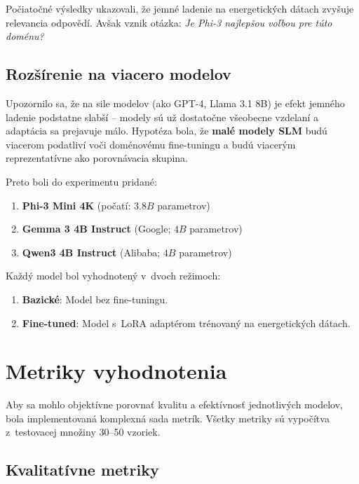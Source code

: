 Počiatočné výsledky ukazovali, že jemné ladenie na energetických dátach zvyšuje relevancia odpovědí. Avšak vznik otázka: \emph{Je Phi-3 najlepšou voľbou pre túto doménu?}


\subsection{Rozšírenie na viacero modelov}

Upozornilo sa, že na sile modelov (ako GPT-4, Llama 3.1 8B) je efekt jemného ladenie podstatne slabší -- modely sú už dostatočne všeobecne vzdelaní a adaptácia sa prejavuje málo. Hypotéza bola, že \textbf{malé modely SLM} budú viacerom podatliví voči doménovému fine-tuningu a budú viacerým reprezentatívne ako porovnávacia skupina.

Preto boli do experimentu pridané:
\begin{enumerate}
    \item \textbf{Phi-3 Mini 4K} (počatí: $3.8B$ parametrov)
    \item \textbf{Gemma 3 4B Instruct} (Google; $4B$ parametrov)
    \item \textbf{Qwen3 4B Instruct} (Alibaba; $4B$ parametrov)
\end{enumerate}

Každý model bol vyhodnotený v~dvoch režimoch:
\begin{enumerate}
    \item \textbf{Bazické}: Model bez fine-tuningu.
    \item \textbf{Fine-tuned}: Model s~LoRA adaptérom trénovaný na energetických dátach.
\end{enumerate}


\section{Metriky vyhodnotenia}\label{sec:metrics}

Aby sa mohlo objektívne porovnať kvalitu a efektívnosť jednotlivých modelov, bola implementovaná komplexná sada metrík. Všetky metriky sú vypočítva z~testovacej množiny 30--50 vzoriek.

\subsection{Kvalitatívne metriky}

